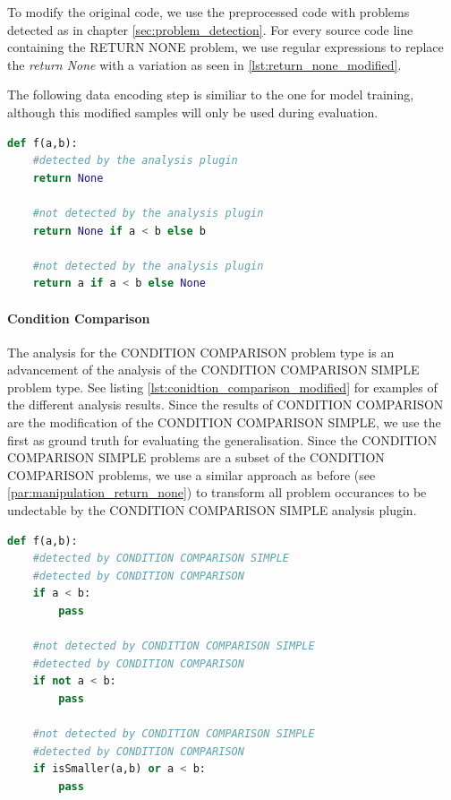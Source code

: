 To modify the original code, we use the preprocessed code with problems detected as in chapter \ref{sec:problem_detection}. For every source code line containing the RETURN NONE problem, we use regular expressions to replace the \textit{return None} with a variation as seen in \ref{lst:return_none_modified}. 

The following data encoding step is similiar to the one for model training, although this modified samples will only be used during evaluation.

\begin{minipage}[c]{\linewidth}
\begin{lstlisting}[language=Python, label=lst:return_none_modified, caption={Samples for returning None. The first return would be flagged by the analysis plugin, the second and third return are modified variations that would be ignored by the analysis plugin. The performance of the machine learning models on detecting the latter will be evaluated.}]
def f(a,b):
    #detected by the analysis plugin
    return None 

    #not detected by the analysis plugin
    return None if a < b else b 

    #not detected by the analysis plugin
    return a if a < b else None \end{lstlisting}
\end{minipage}
\paragraph{Condition Comparison}
The analysis for the CONDITION COMPARISON problem type is an advancement of the analysis of the CONDITION COMPARISON SIMPLE problem type.  See listing \ref{lst:conidtion_comparison_modified} for examples of the different analysis results.
Since the results of CONDITION COMPARISON are the modification of the CONDITION COMPARISON SIMPLE, we use the first as ground truth for evaluating the generalisation. Since the CONDITION COMPARISON SIMPLE problems are a subset of the CONDITION COMPARISON problems, we use a similar approach as before (see \ref{par:manipulation_return_none}) to transform all problem occurances to be undectable by the CONDITION COMPARISON SIMPLE analysis plugin.

\begin{minipage}[c]{0.95\linewidth}
\begin{lstlisting}[language=Python, label=lst:conidtion_comparison_modified, caption={Sample statements for the differnce between the two analysis plugins CONDITION COMPARISON and CONDITION COMPARISON SIMPLE.  }]
    def f(a,b):
    #detected by CONDITION COMPARISON SIMPLE
    #detected by CONDITION COMPARISON
    if a < b:
        pass 

    #not detected by CONDITION COMPARISON SIMPLE
    #detected by CONDITION COMPARISON
    if not a < b:
        pass 

    #not detected by CONDITION COMPARISON SIMPLE
    #detected by CONDITION COMPARISON
    if isSmaller(a,b) or a < b:
        pass \end{lstlisting}
\end{minipage}